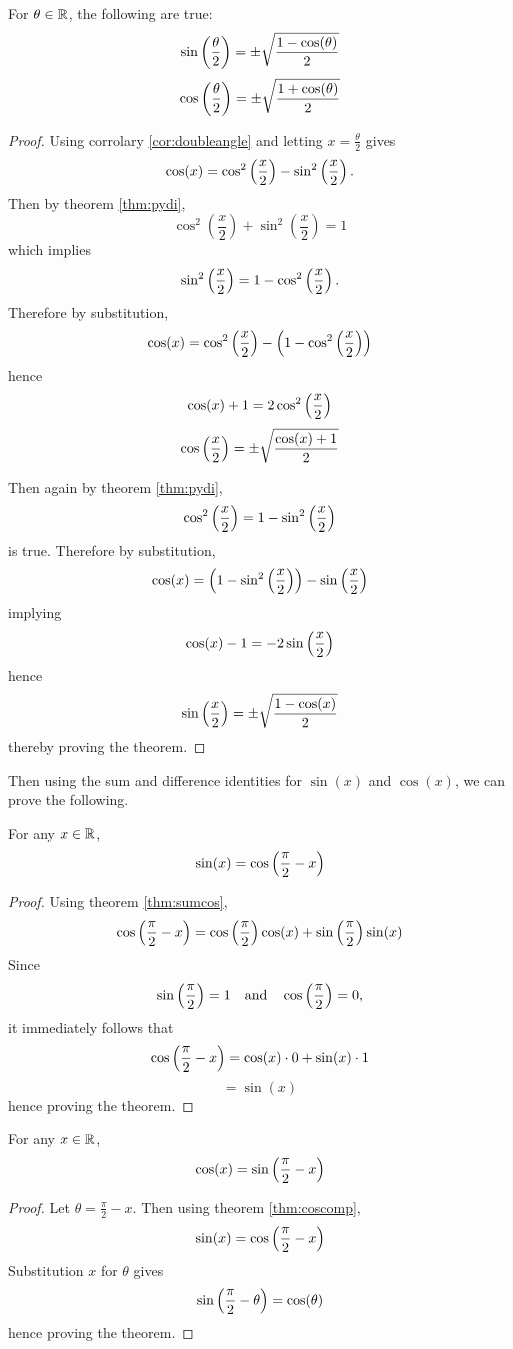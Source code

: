 \begin{cor}
	For $\theta\in\mathbb{R}$, the following are true:
	$$\sin\left(\frac{\theta}{2}\right)=\pm\sqrt{\frac{1-\cos(\theta)}{2}}$$
	$$\cos\left(\frac{\theta}{2}\right)=\pm\sqrt{\frac{1+\cos(\theta)}{2}}$$
\end{cor}
\begin{proof}
	Using corrolary \eqref{cor:doubleangle} and letting $x=\frac{\theta}{2}$ gives
	$$\cos(x)=\cos^2\left(\frac{x}{2}\right)-\sin^2\left(\frac{x}{2}\right).$$
	Then by theorem \eqref{thm:pydi},
	$$\cos^2(\frac{x}{2})+\sin^2(\frac{x}{2})=1$$
	which implies
	$$\sin^2\left(\frac{x}{2}\right)=1-\cos^2\left(\frac{x}{2}\right).$$
	Therefore by substitution,
	$$\cos(x)=\cos^2\left(\frac{x}{2}\right)-\left(1-\cos^2\left(\frac{x}{2}\right)\right)$$
	hence
	$$\cos(x)+1=2\cos^2\left(\frac{x}{2}\right)$$
	$$\cos\left(\frac{x}{2}\right)=\pm\sqrt{\frac{\cos(x)+1}{2}}$$

	Then again by theorem \eqref{thm:pydi},
	$$\cos^2\left(\frac{x}{2}\right)=1-\sin^2\left(\frac{x}{2}\right)$$
	is true.
	Therefore by substitution,
	$$\cos(x)=\left(1-\sin^2\left(\frac{x}{2}\right)\right)-\sin\left(\frac{x}{2}\right)$$
	implying
	$$\cos(x)-1=-2\sin\left(\frac{x}{2}\right)$$
	hence
	$$\sin\left(\frac{x}{2}\right)=\pm\sqrt{\frac{1-\cos(x)}{2}}$$
	thereby proving the theorem.
\end{proof}

Then using the sum and difference identities for $\sin(x)$ and $\cos(x)$, we can prove the following.

\begin{theorem}
For any $x\in\mathbb{R}$,
$$\sin(x)=\cos\left(\frac{\pi}{2}-x\right)$$
\label{thm:coscomp}
\end{theorem}
\begin{proof}
	Using theorem \eqref{thm:sumcos},
	$$\cos\left(\frac{\pi}{2}-x\right)=\cos\left(\frac{\pi}{2}\right)\cos(x)+\sin\left(\frac{\pi}{2}\right)\sin(x)$$
	Since
	$$\sin\left(\frac{\pi}{2}\right)=1 \quad\text{and}\quad \cos\left(\frac{\pi}{2}\right)=0,$$
	it immediately follows that
	$$\cos\left(\frac{\pi}{2}-x\right)=\cos(x)\cdot 0 + \sin(x)\cdot 1$$
	$$=\sin(x)$$
	hence proving the theorem.
\end{proof}

\begin{cor}
	For any $x\in\mathbb{R}$,
	$$\cos(x)=\sin\left(\frac{\pi}{2}-x\right)$$
	\label{cor:sincomp}
\end{cor}
\begin{proof}
	Let $\theta=\frac{\pi}{2}-x$. Then using theorem \eqref{thm:coscomp},
	$$\sin(x)=\cos\left(\frac{\pi}{2}-x\right)$$
	Substitution $x$ for $\theta$ gives
	$$\sin\left(\frac{\pi}{2}-\theta\right)=\cos(\theta)$$
	hence proving the theorem.
\end{proof}

